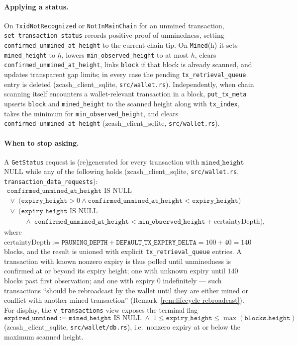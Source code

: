 \documentclass[11pt,a4paper]{article}
\theoremstyle{definition}
\begin{document}
\paragraph{Applying a status.} On \texttt{TxidNotRecognized} or
\texttt{NotInMainChain} for an unmined transaction,
\texttt{set\_transaction\_status} records positive proof of unminedness,
setting \texttt{confirmed\_unmined\_at\_height} to the current chain tip.
On \texttt{Mined}(h) it sets \texttt{mined\_height} to $h$, lowers
\texttt{min\_observed\_height} to at most $h$, clears
\texttt{confirmed\_unmined\_at\_height}, links \texttt{block} if that block
is already scanned, and updates transparent gap limits; in every case the
pending \texttt{tx\_retrieval\_queue} entry is deleted
(\textsf{zcash\_client\_sqlite}, \texttt{src/wallet.rs}). Independently,
when chain scanning itself encounters a wallet-relevant transaction in a
block, \texttt{put\_tx\_meta} upserts \texttt{block} and
\texttt{mined\_height} to the scanned height along with \texttt{tx\_index},
takes the minimum for \texttt{min\_observed\_height}, and clears
\texttt{confirmed\_unmined\_at\_height}
(\textsf{zcash\_client\_sqlite}, \texttt{src/wallet.rs}).

\paragraph{When to stop asking.} A \texttt{GetStatus} request is
(re)generated for every transaction with $\mathtt{mined\_height}$ NULL
while any of the following holds
(\textsf{zcash\_client\_sqlite}, \texttt{src/wallet.rs},
\texttt{transaction\_data\_requests}):
\[
\begin{array}{l}
\mathtt{confirmed\_unmined\_at\_height} \text{ IS NULL} \\
\;\vee\; \bigl(\mathtt{expiry\_height} > 0 \wedge
  \mathtt{confirmed\_unmined\_at\_height} < \mathtt{expiry\_height}\bigr) \\
\;\vee\; \bigl(\mathtt{expiry\_height} \text{ IS NULL} \\
\qquad\;\; \wedge\; \mathtt{confirmed\_unmined\_at\_height} <
  \mathtt{min\_observed\_height} + \mathrm{certaintyDepth}\bigr),
\end{array}
\]
where $\mathrm{certaintyDepth} := \mathtt{PRUNING\_DEPTH} +
\mathtt{DEFAULT\_TX\_EXPIRY\_DELTA} = 100 + 40 = 140$ blocks, and the
result is unioned with explicit \texttt{tx\_retrieval\_queue} entries. A
transaction with known nonzero expiry is thus polled until unminedness is
confirmed at or beyond its expiry height; one with unknown expiry until
$140$ blocks past first observation; and one with expiry $0$ indefinitely
--- such transactions ``should be rebroadcast by the wallet until they are
either mined or conflict with another mined transaction''
(Remark~\ref{rem:lifecycle-rebroadcast}). For display, the
\texttt{v\_transactions} view exposes the terminal flag
\[
\mathtt{expired\_unmined} :=
\mathtt{mined\_height} \text{ IS NULL} \;\wedge\;
1 \le \mathtt{expiry\_height} \le \max(\mathtt{blocks.height})
\]
(\textsf{zcash\_client\_sqlite}, \texttt{src/wallet/db.rs}), i.e.\ nonzero
expiry at or below the maximum scanned height.
\end{document}
